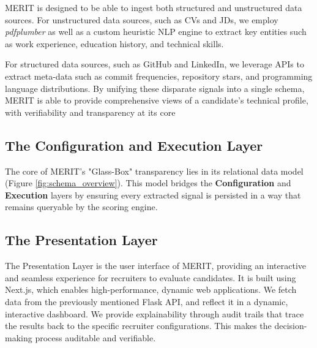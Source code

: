 

MERIT is designed to be able to ingest both structured and unstructured data sources.
For unstructured data sources, such as CVs and JDs, we employ \textit{pdfplumber} as well
as a custom heuristic NLP engine to extract key entities such as work experience, education 
history, and technical skills.

For structured data sources, such as GitHub and LinkedIn, we leverage APIs to extract
meta-data such as commit frequencies, repository stars, and programming language 
distributions. By unifying these disparate signals into a single schema, MERIT is able to provide
comprehensive views of a candidate's technical profile, with verifiability and transparency at its core


\subsection{The Configuration and Execution Layer}

The core of MERIT's "Glass-Box" transparency lies in its relational 
data model (Figure \ref{fig:schema_overview}). This model bridges the 
\textbf{Configuration} and \textbf{Execution} layers by ensuring every extracted 
signal is persisted in a way that remains queryable by the scoring engine.


\subsection{The Presentation Layer}
The Presentation Layer is the user interface of MERIT, providing an interactive 
and seamless experience for recruiters to evaluate candidates. It is built 
using Next.js, which enables high-performance, dynamic web applications. 
We fetch data from the previously mentioned Flask API, and reflect it
in a dynamic, interactive dashboard. We provide explainability through audit trails
that trace the results back to the specific recruiter configurations. This makes 
the decision-making process auditable and verifiable.
